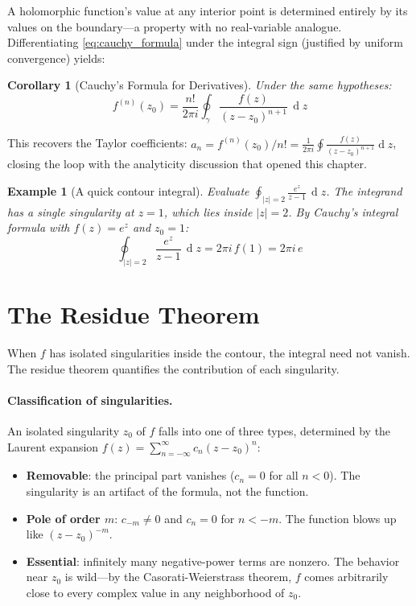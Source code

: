 \documentclass[12pt,a4paper]{report}
\DeclareMathOperator{\deriv}{d}
\theoremstyle{thms}
\newtheorem{corollary}{Corollary}[theorem]
\theoremstyle{defns}
\newtheorem{example}{Example}[section]
\begin{document}
A holomorphic function's value at any interior point is determined entirely by its values on the boundary—a property with no real-variable analogue. Differentiating \eqref{eq:cauchy_formula} under the integral sign (justified by uniform convergence) yields:

\begin{corollary}[Cauchy's Formula for Derivatives]
    Under the same hypotheses:
    \begin{equation}
        f^{(n)}(z_0) = \dfrac{n!}{2\pi i}\oint_\gamma \dfrac{f(z)}{(z - z_0)^{n+1}}\,\deriv{z}
        \label{eq:cauchy_deriv}
    \end{equation}
\end{corollary}

This recovers the Taylor coefficients: $a_n = f^{(n)}(z_0)/n! = \frac{1}{2\pi i}\oint \frac{f(z)}{(z-z_0)^{n+1}}\deriv{z}$, closing the loop with the analyticity discussion that opened this chapter.

\begin{example}[A quick contour integral]
    Evaluate $\oint_{|z|=2} \frac{e^z}{z - 1}\,\deriv{z}$. The integrand has a single singularity at $z = 1$, which lies inside $|z| = 2$. By Cauchy's integral formula with $f(z) = e^z$ and $z_0 = 1$:
    \begin{equation}
        \oint_{|z|=2} \dfrac{e^z}{z - 1}\,\deriv{z} = 2\pi i\,f(1) = 2\pi i\,e
    \end{equation}
\end{example}

\section{The Residue Theorem}
\label{sec:residue}

When $f$ has isolated singularities inside the contour, the integral need not vanish. The residue theorem quantifies the contribution of each singularity.

\paragraph{Classification of singularities.} An isolated singularity $z_0$ of $f$ falls into one of three types, determined by the Laurent expansion $f(z) = \sum_{n=-\infty}^{\infty} c_n(z - z_0)^n$:
\begin{itemize}
    \item \textbf{Removable}: the principal part vanishes ($c_n = 0$ for all $n < 0$). The singularity is an artifact of the formula, not the function.
    \item \textbf{Pole of order $m$}: $c_{-m} \neq 0$ and $c_n = 0$ for $n < -m$. The function blows up like $(z - z_0)^{-m}$.
    \item \textbf{Essential}: infinitely many negative-power terms are nonzero. The behavior near $z_0$ is wild—by the Casorati-Weierstrass theorem, $f$ comes arbitrarily close to every complex value in any neighborhood of $z_0$.
\end{itemize}
\end{document}
